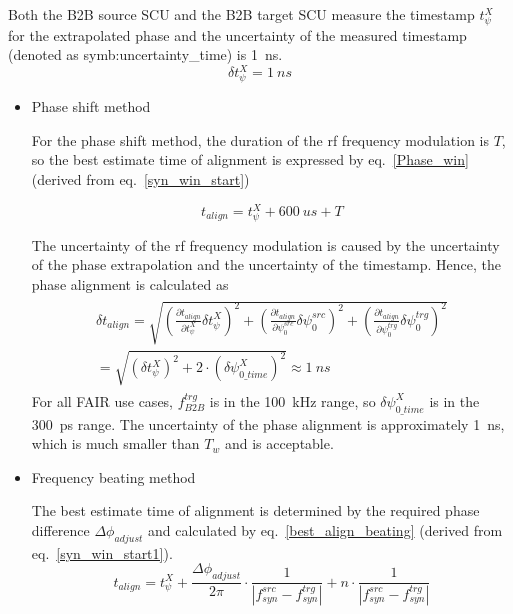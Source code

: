 Both the B2B source SCU and the B2B target SCU measure the timestamp $t_\psi^X$ for the extrapolated phase and the uncertainty of the measured timestamp (denoted as \gls{symb:uncertainty_time}) is \SI{1}{ns}.  
\begin{equation} 
\delta t_\psi^X= \SI{1}{ns}
\label{jitter_measure_t}
\end{equation}

\begin{itemize}
\item Phase shift method

For the phase shift method, the duration of the rf frequency modulation is $T$, so the best estimate time of alignment is expressed by  eq.~\ref{Phase_win} (derived from eq.~\ref{syn_win_start})

\begin{equation}
t_\mathit{align} = t_{\psi}^X + \SI{600}{us}+T \label{Phase_win}
\end{equation}

The uncertainty of the rf frequency modulation is caused by the uncertainty of the phase extrapolation and the uncertainty of the timestamp. Hence, the phase alignment is calculated as
\begin{eqnarray}
\begin{aligned}
\delta t_\mathit{align} = \sqrt {(\frac {\partial t_\mathit{align}}{\partial t_\psi^\mathit{X}} \delta t_\psi^\mathit{X})^2 +(\frac {\partial t_\mathit{align}}{\partial \psi^\mathit{src}_0} \delta\psi^\mathit{src}_0)^2+(\frac {\partial t_\mathit{align}}{\partial \psi^\mathit{trg}_0} \delta\psi^\mathit{trg}_0)^2  }\\
=\sqrt {(\delta t_{\psi}^X)^2 + 2\cdot(\delta \psi^{X}_\mathit{0\_time})^2 }\approx \SI{1}{ns}
\end{aligned}
\end{eqnarray}
For all FAIR use cases, $f_\mathit{B2B}^\mathit{trg}$ is in the \SI{100}{kHz} range, so $\delta \psi^{X}_\mathit{0\_time}$ is in the \SI{300}{ps} range. The uncertainty of the phase alignment is approximately \SI{1}{ns}, which is much smaller than $T_\mathit{w}$ and is acceptable.

\item Frequency beating method

The best estimate time of alignment is determined by the required phase difference $\Delta \phi_\mathit{adjust}$ and calculated by eq.~\ref{best_align_beating} (derived from eq.~\ref{syn_win_start1}).
\begin{equation}
t_\mathit{align}= t_\psi^\mathit{X}+\frac{\Delta \phi_\mathit{adjust}}{2\pi}\cdot\frac{1}{|f_{\mathit{syn}}^\mathit{src}-f_{\mathit{syn}}^\mathit{trg}|}+ n\cdot \frac{1}{|f_{\mathit{syn}}^\mathit{src}-f_{\mathit{syn}}^\mathit{trg}|}
\label{best_align_beating}
\end{equation}


\end{itemize}

